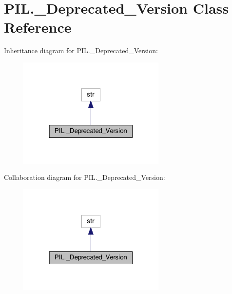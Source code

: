 \hypertarget{classPIL_1_1__Deprecated__Version}{}\section{P\+I\+L.\+\_\+\+Deprecated\+\_\+\+Version Class Reference}
\label{classPIL_1_1__Deprecated__Version}


Inheritance diagram for P\+I\+L.\+\_\+\+Deprecated\+\_\+\+Version\+:
\nopagebreak
\begin{figure}[H]
\begin{center}
\leavevmode
\includegraphics[width=208pt]{classPIL_1_1__Deprecated__Version__inherit__graph}
\end{center}
\end{figure}


Collaboration diagram for P\+I\+L.\+\_\+\+Deprecated\+\_\+\+Version\+:
\nopagebreak
\begin{figure}[H]
\begin{center}
\leavevmode
\includegraphics[width=208pt]{classPIL_1_1__Deprecated__Version__coll__graph}
\end{center}
\end{figure}
